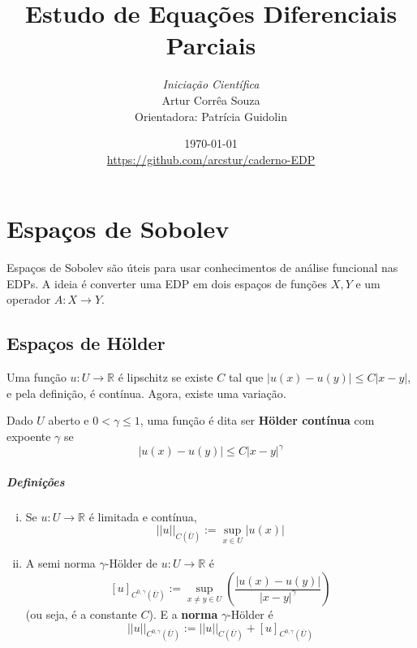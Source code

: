 \documentclass[a4paper, 11pt]{book}
\title{Estudo de Equações Diferenciais Parciais}
\author{\textit{Iniciação Científica}\\   Artur Corrêa Souza \\ Orientadora: Patrícia Guidolin}
\date{\today \\  \url{https://github.com/arcstur/caderno-EDP}}
\newcommand{\R}{\mathbb{R}}
\begin{document}
\mainmatter
\maketitle
\tableofcontents

% 
\setcounter{chapter}{4}
\chapter{Espaços de Sobolev}

Espaços de Sobolev são úteis para usar conhecimentos de análise funcional nas EDPs. A ideia é converter uma EDP em dois espaços de funções \( X,Y \) e um operador \( A:X \rightarrow Y \).

\newcommand{\sobolevdef}{W^{k,p}(U)}
\newcommand{\sobolevum}{W^{1,p}(U)}
\newcommand{\sobolevloc}{W^{k,p}_{loc}(U)}

\section{Espaços de Hölder}

Uma função \( u:U\rightarrow \R \) é lipschitz se existe \( C \) tal que \( |u(x)-u(y)| \leq C|x-y| \), e pela definição, é contínua. Agora, existe uma variação.

Dado \( U \) aberto e \( 0 < \gamma \leq 1 \), uma função é dita ser \textbf{Hölder contínua} com expoente \( \gamma \) se \[ |u(x)-u(y)| \leq C |x-y|^\gamma \]

\paragraph{Definições} \begin{enumerate}[(i)]
	\item Se \( u:U \rightarrow \R \) é limitada e contínua, \[ ||u||_{C(\overline{U})} := \sup_{x \in U} |u(x)| \]
	\item A semi norma \( \gamma \)-Hölder de \( u:U \rightarrow \R \) é \[ [u]_{C^{0,\gamma}(\overline{U})} := \sup_{x\neq y \in U} \left( \frac{|u(x) - u(y)|}{|x-y|^\gamma}\right) \] (ou seja, é a constante \( C \)). E a \textbf{norma} \( \gamma\)-Hölder é \[ ||u||_{C^{0,\gamma}(\overline{U})} := ||u||_{C(\overline{U})} + [u]_{C^{0,\gamma}(\overline{U})} \]
\end{enumerate}
\end{document}
